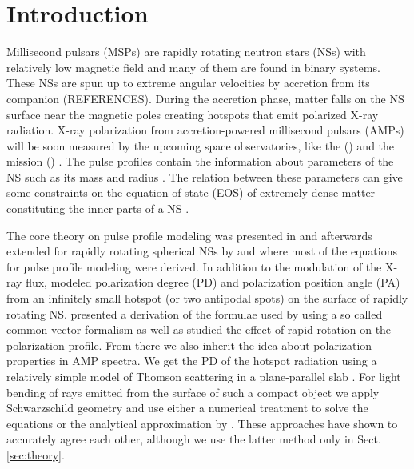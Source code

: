 \documentclass{aa}
\begin{document}

\maketitle

\section{Introduction}\label{sec:intro}

Millisecond pulsars (MSPs) are rapidly rotating neutron stars (NSs) with relatively low magnetic field and many of them are found in binary systems.  
These NSs are spun up to extreme angular velocities by accretion from its companion (REFERENCES). 
During the accretion phase, matter falls on the NS surface near the magnetic poles creating hotspots that emit polarized X-ray radiation. 
X-ray polarization from accretion-powered millisecond pulsars (AMPs) will be soon measured by the upcoming space observatories, like the  () \citep{IXPE} and the  mission () \citep{EXTP,dmatter_extp}. 
The pulse profiles contain the information about parameters of the NS such as its mass and radius  \citep[e.g.][]{PG03,2016RvMP...88b1001W,SNP18,Bogdanov19L26}. 
The relation between these parameters can give some constraints on the equation of state (EOS) of extremely dense matter constituting the inner parts of a NS \citep[for instance, see][]{lindblom1992,Lattimer12ARNPS}.


The core theory on pulse profile modeling was presented in \cite{PFC83} and afterwards extended for rapidly rotating spherical NSs by \citet{PG03} and \citet{PB06} where most of the equations for pulse profile modeling were derived. 
In addition to the modulation of the X-ray flux, \citet{VP04} modeled polarization degree (PD) and polarization position angle (PA) from an infinitely small hotspot (or two antipodal spots) on the surface of rapidly rotating NS. 
\citet{poutanen20} presented a derivation of the formulae used by \citet{VP04} using a so called common vector formalism as well as studied the effect of rapid rotation on the polarization profile. 
From there we also inherit the idea about polarization properties in AMP spectra. 
We get the PD of the hotspot radiation using a relatively simple model of Thomson scattering in a plane-parallel slab \citep[see e.g.][]{ST85,VP04}. 
For light bending of rays emitted from the surface of such a compact object we apply Schwarzschild geometry \citep{mtw73,PFC83} and use either a numerical treatment to solve the equations \citep[explained e.g. in][]{SNP18} or the analytical approximation by \citet{poutanen19}.
These approaches have shown to accurately agree each other, although we use the latter method only in Sect.\,\ref{sec:theory}.
\end{document}
